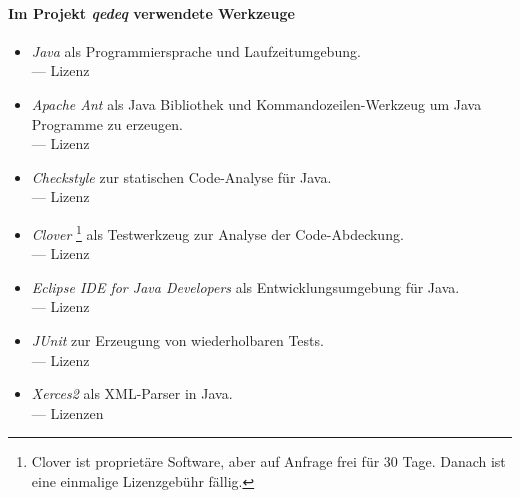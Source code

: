 \color{gray}%
\paragraph{Im Projekt \emph{qedeq} verwendete Werkzeuge}%

\begin{itemize}
	\setcounter{enumi}{\value{Enumi}}%

	\item\label{Werkzeug:Java}\emph{Java} als Programmiersprache und Laufzeitumgebung.
	\\
	--- Lizenz 

	\item\label{Werkzeug:Apache Ant}\emph{Apache Ant} als Java Bibliothek und Kommandozeilen-Werkzeug
	um Java Programme zu erzeugen.
	\\
	--- Lizenz 

	\item\label{Werkzeug:Checkstyle}\emph{Checkstyle} zur statischen Code-Analyse für Java.
	\\
	--- Lizenz 

	\item\label{Werkzeug:Clover}\emph{Clover}%
	\footnote{%
		Clover ist proprietäre Software, aber auf Anfrage frei für 30 Tage.
		Danach ist eine einmalige Lizenzgebühr fällig.
	}
	als Testwerkzeug zur Analyse der Code-Abdeckung.
	\\
	--- Lizenz 

	\item\label{Werkzeug:Eclipse Java}\emph{Eclipse IDE for Java Developers} als Entwicklungsumgebung für Java.
	\\
	--- Lizenz 

	\item\label{Werkzeug:JUnit}\emph{JUnit} zur Erzeugung von wiederholbaren Tests.
	\\
	--- Lizenz 

	\item\label{Werkzeug:Xerces2}\emph{Xerces2} als XML-Parser in Java.
	\\
	--- Lizenzen 
\end{itemize}
\color{black}%


